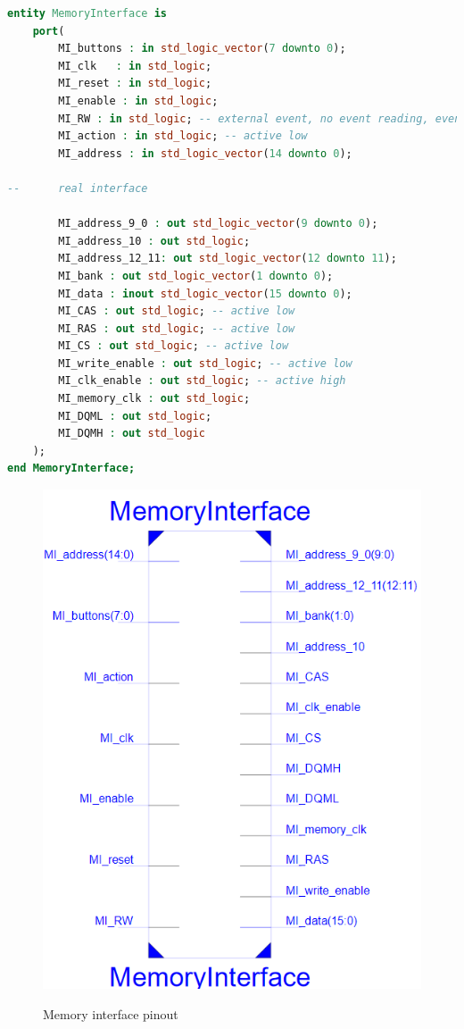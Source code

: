 \begin{lstlisting}[caption=VHDL entity of memory manager, language=VHDL]
entity MemoryInterface is
	port(
		MI_buttons : in std_logic_vector(7 downto 0);
		MI_clk	 : in std_logic;
		MI_reset : in std_logic;
		MI_enable : in std_logic;
		MI_RW : in std_logic; -- external event, no event reading, event writing
		MI_action : in std_logic; -- active low
		MI_address : in std_logic_vector(14 downto 0);
		
--		real interface
		
		MI_address_9_0 : out std_logic_vector(9 downto 0);
		MI_address_10 : out std_logic;
		MI_address_12_11: out std_logic_vector(12 downto 11);
		MI_bank : out std_logic_vector(1 downto 0);
		MI_data : inout std_logic_vector(15 downto 0);
		MI_CAS : out std_logic; -- active low
		MI_RAS : out std_logic; -- active low
		MI_CS : out std_logic; -- active low
		MI_write_enable : out std_logic; -- active low
		MI_clk_enable : out std_logic; -- active high
		MI_memory_clk : out std_logic;
		MI_DQML : out std_logic;
		MI_DQMH : out std_logic
	);
end MemoryInterface;
\end{lstlisting}

\begin{figure}[H]
\centering
\includegraphics[scale=.6]{Immagini/27}
\label{27}
\caption{Memory interface pinout}
\end{figure}

